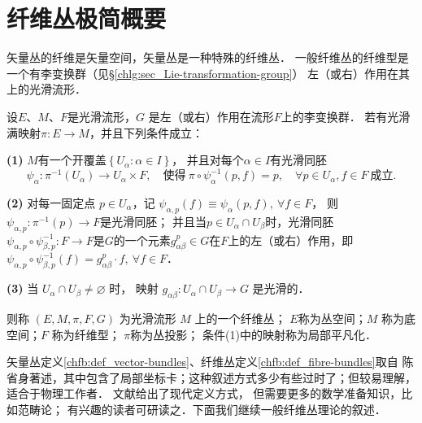 
\section{纤维丛极简概要}\label{chfb:sec_fb}
矢量丛的纤维是矢量空间，矢量丛是一种特殊的纤维丛．
一般纤维丛的纤维型是一个有李变换群（见\S\ref{chlg:sec_Lie-transformation-group}）
左（或右）作用在其上的光滑流形．

\begin{definition}\label{chfb:def_fibre-bundles}
    设$E$、$ M$、$ F$是光滑流形，$G$ 是左（或右）作用在流形$F$上的李变换群．
    若有光滑满映射$\pi: E \rightarrow M$，并且下列条件成立：
    
    {\bfseries (1)} $M$有一个开覆盖$\left\{U_\alpha: \alpha \in I\right\}$，
    并且对每个$\alpha \in I$有光滑同胚
    \begin{equation*}
        \psi_\alpha: \pi^{-1}(U_\alpha) \to U_\alpha \times F,
        \quad \text{使得}\ 
        \pi \circ \psi_\alpha^{-1}(p, f)=p, \quad \forall p \in U_\alpha, f \in F 
        \ \text{成立}.
    \end{equation*}
    
    {\bfseries (2)} 对每一固定点 $p \in U_\alpha$，记
    $\psi_{\alpha, p}(f)\equiv \psi_\alpha(p, f), \ \forall f \in F$，
    则 $\psi_{\alpha, p}: \pi^{-1}(p)\to F$是光滑同胚；
    并且当$p \in U_\alpha \cap U_\beta$时，光滑同胚$\psi_{\alpha, p}\circ \psi_{\beta, p}^{-1}:
    F \rightarrow F$是$G$的一个元素$g_{\alpha \beta}^p\in G$在$F$上的左（或右）作用，即
    $\psi_{\alpha, p} \circ \psi_{\beta, p}^{-1}(f)=g^p_{\alpha \beta} \cdot f, 
    \ \forall f \in F$．
    
    
    {\bfseries (3)} 当 $U_\alpha \cap U_\beta \neq \varnothing$ 时，
    映射 $g_{\alpha \beta}: U_\alpha \cap U_\beta \rightarrow G$ 是光滑的．
    
    则称 $(E, M, \pi, F, G)$ 为光滑流形 $M$ 上的一个{\heiti 纤维丛}；
    $E$称为{\heiti 丛空间}；$M$ 称为{\heiti 底空间}；$F$ 称为{\heiti 纤维型}；
    $\pi$称为{\heiti 丛投影}；
    条件(1)中的映射称为{\heiti 局部平凡化}．
\end{definition}

矢量丛定义\ref{chfb:def_vector-bundles}、纤维丛定义\ref{chfb:def_fibre-bundles}取自
陈省身著述，其中包含了局部坐标卡；这种叙述方式多少有些过时了；但较易理解，适合于物理工作者．
文献\parencite{Husemoller-1994}给出了现代定义方式，%
但需要更多的数学准备知识，比如范畴论；
有兴趣的读者可研读之．下面我们继续一般纤维丛理论的叙述．

